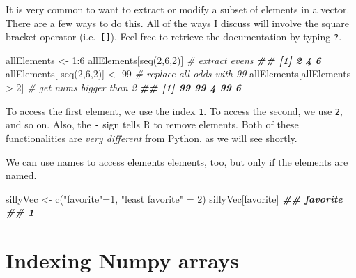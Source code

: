 \documentclass[
  12pt,
]{krantz}
\makeatletter
\newenvironment{Shaded}{\begin{snugshade}}{\end{snugshade}}
\newcommand{\CommentTok}[1]{\textcolor[rgb]{0.37,0.37,0.37}{\textit{#1}}}
\newcommand{\DecValTok}[1]{\textcolor[rgb]{0.06,0.06,0.06}{#1}}
\newcommand{\DocumentationTok}[1]{\textcolor[rgb]{0.37,0.37,0.37}{\textbf{\textit{#1}}}}
\newcommand{\FunctionTok}[1]{\textcolor[rgb]{0,0,0}{#1}}
\newcommand{\NormalTok}[1]{#1}
\newcommand{\OtherTok}[1]{\textcolor[rgb]{0.37,0.37,0.37}{#1}}
\newcommand{\SpecialCharTok}[1]{\textcolor[rgb]{0,0,0}{#1}}
\newcommand{\StringTok}[1]{\textcolor[rgb]{0.5,0.5,0.5}{#1}}
\newenvironment{kframe}{%
\medskip{}
\setlength{\fboxsep}{.8em}
 \def\at@end@of@kframe{}%
 \ifinner\ifhmode%
  \def\at@end@of@kframe{\end{minipage}}%
  \begin{minipage}{\columnwidth}%
 \fi\fi%
 \def\FrameCommand##1{\hskip\@totalleftmargin \hskip-\fboxsep
 \colorbox{shadecolor}{##1}\hskip-\fboxsep
     \hskip-\linewidth \hskip-\@totalleftmargin \hskip\columnwidth}%
 \MakeFramed {\advance\hsize-\width
   \@totalleftmargin\z@ \linewidth\hsize
   \@setminipage}}%
 {\par\unskip\endMakeFramed%
 \at@end@of@kframe}
\renewenvironment{Shaded}{\begin{kframe}}{\end{kframe}}
\makeatother
\begin{document}
It is very common to want to extract or modify a subset of elements in a vector. There are a few ways to do this. All of the ways I discuss will involve the square bracket operator (i.e.~\texttt{{[}{]}}). Feel free to retrieve the documentation by typing \texttt{?\textquotesingle{}{[}\textquotesingle{}}.

\begin{Shaded}
\begin{Highlighting}[]
\NormalTok{allElements }\OtherTok{\textless{}{-}} \DecValTok{1}\SpecialCharTok{:}\DecValTok{6}
\NormalTok{allElements[}\FunctionTok{seq}\NormalTok{(}\DecValTok{2}\NormalTok{,}\DecValTok{6}\NormalTok{,}\DecValTok{2}\NormalTok{)] }\CommentTok{\# extract evens}
\DocumentationTok{\#\# [1] 2 4 6}
\NormalTok{allElements[}\SpecialCharTok{{-}}\FunctionTok{seq}\NormalTok{(}\DecValTok{2}\NormalTok{,}\DecValTok{6}\NormalTok{,}\DecValTok{2}\NormalTok{)] }\OtherTok{\textless{}{-}} \DecValTok{99} \CommentTok{\# replace all odds with 99}
\NormalTok{allElements[allElements }\SpecialCharTok{\textgreater{}} \DecValTok{2}\NormalTok{] }\CommentTok{\# get nums bigger than 2}
\DocumentationTok{\#\# [1] 99 99  4 99  6}
\end{Highlighting}
\end{Shaded}

To access the first element, we use the index \texttt{1}. To access the second, we use \texttt{2}, and so on. Also, the \texttt{-} sign tells R to remove elements. Both of these functionalities are \emph{very different} from Python, as we will see shortly.

We can use names to access elements elements, too, but only if the elements are named.

\begin{Shaded}
\begin{Highlighting}[]
\NormalTok{sillyVec }\OtherTok{\textless{}{-}} \FunctionTok{c}\NormalTok{(}\StringTok{"favorite"}\OtherTok{=}\DecValTok{1}\NormalTok{, }\StringTok{"least favorite"} \OtherTok{=} \DecValTok{2}\NormalTok{)}
\NormalTok{sillyVec[}\StringTok{\textquotesingle{}favorite\textquotesingle{}}\NormalTok{]}
\DocumentationTok{\#\# favorite }
\DocumentationTok{\#\#        1}
\end{Highlighting}
\end{Shaded}

\hypertarget{indexing-numpy-arrays}{%
\section{Indexing Numpy arrays}\label{indexing-numpy-arrays}}
\end{document}
